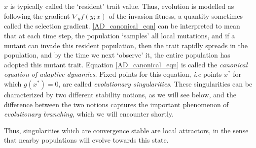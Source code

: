  $x$ is typically called the `resident' trait value. Thus, evolution is modelled as following the gradient $\nabla_y f(y;x)$ of the invasion fitness, a quantity sometimes called the selection gradient. \eqref{AD_canonical_eqn} can be interpreted to mean that at each time step, the population `samples' all local mutations, and if a mutant can invade this resident population, then the trait rapidly spreads in the population, and by the time we next `observe' it, the entire population has adopted this mutant trait. Equation \eqref{AD_canonical_eqn} is called the \emph{canonical equation of adaptive dynamics}. Fixed points for this equation, \textit{i.e} points $x^*$ for which $g(x^*)=0$, are called \emph{evolutionary singularities}. These singularities can be characterized by two different stability notions, as we will see below, and the difference between the two notions captures the important phenomenon of \textit{evolutionary branching}, which we will encounter shortly.


Thus, singularities which are convergence stable are local attractors, in the sense that nearby populations will evolve towards this state.

